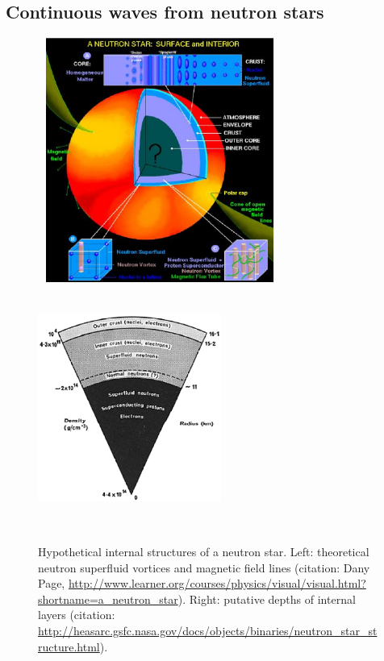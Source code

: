        \subsection{Continuous waves from neutron stars}
        \label{continuous_waves}

	\begin{figure}
	\begin{center}
        \includegraphics[height=80mm, width=80mm]{plots/a_neutron_star.eps}
	\includegraphics[height=80mm, width=60mm]{neutron_star_structure.eps}
	\caption{Hypothetical internal structures of a neutron star.  Left: theoretical neutron superfluid vortices and magnetic field lines (citation: Dany Page, \url{http://www.learner.org/courses/physics/visual/visual.html?shortname=a_neutron_star}). Right: putative depths of internal layers (citation: \url{http://heasarc.gsfc.nasa.gov/docs/objects/binaries/neutron_star_structure.html}).} 
	\label{neutron_star_structure}
	\end{center}
	\end{figure}


